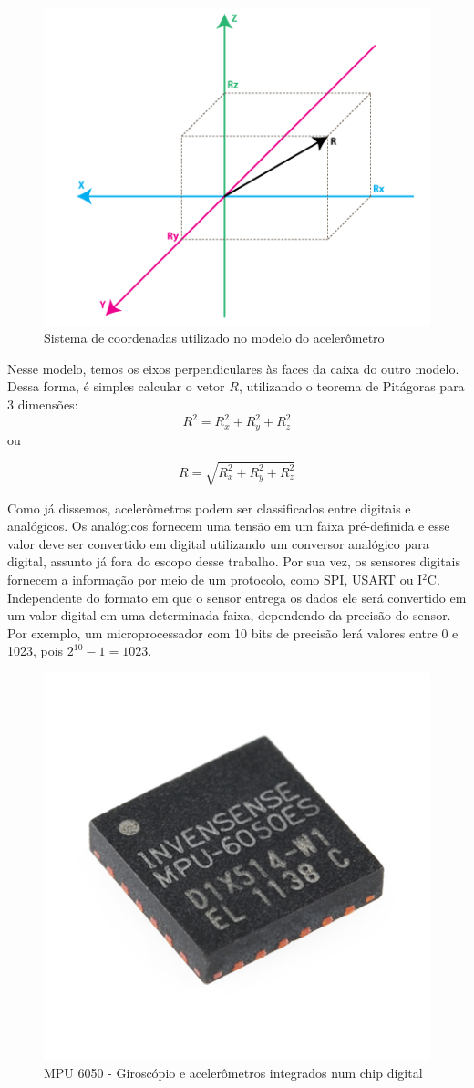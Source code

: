 \documentclass[a4paper,12pt]{article}
\begin{document}
\begin{figure}[H]
\centering
\includegraphics[width=.5\textwidth]{img/eixos1.png}
\caption{Sistema de coordenadas utilizado no modelo do acelerômetro}
\label{eixos1}
\end{figure}

Nesse modelo, temos os eixos perpendiculares às faces da caixa do outro modelo. Dessa forma, é simples calcular o vetor $R$, utilizando o teorema de Pitágoras para 3 dimensões: $$R^2=R_x^2+R_y^2+R_z^2$$ ou 

\begin{equation}
R=\sqrt{R_x^2+R_y^2+R_z^2}
\label{pit3d}
\end{equation}

\medskip
Como já dissemos, acelerômetros podem ser classificados entre digitais e analógicos. Os analógicos fornecem uma tensão em um faixa pré-definida e esse valor deve ser convertido em digital utilizando um conversor analógico para digital, assunto já fora do escopo desse trabalho. Por sua vez, os sensores digitais fornecem a informação por meio de um protocolo, como SPI, USART ou I$^2$C. Independente do formato em que o sensor entrega os dados ele será convertido em um valor digital em uma determinada faixa, dependendo da precisão do sensor. Por exemplo, um microprocessador com 10 bits de precisão lerá valores entre 0 e 1023,  pois $2^{10}-1=1023$.


\begin{figure}[H]
\centering
\includegraphics[width=.4\textwidth]{img/chip2.jpg}
\caption{MPU 6050 - Giroscópio e acelerômetros integrados num chip digital}
\end{figure}
\end{document}
